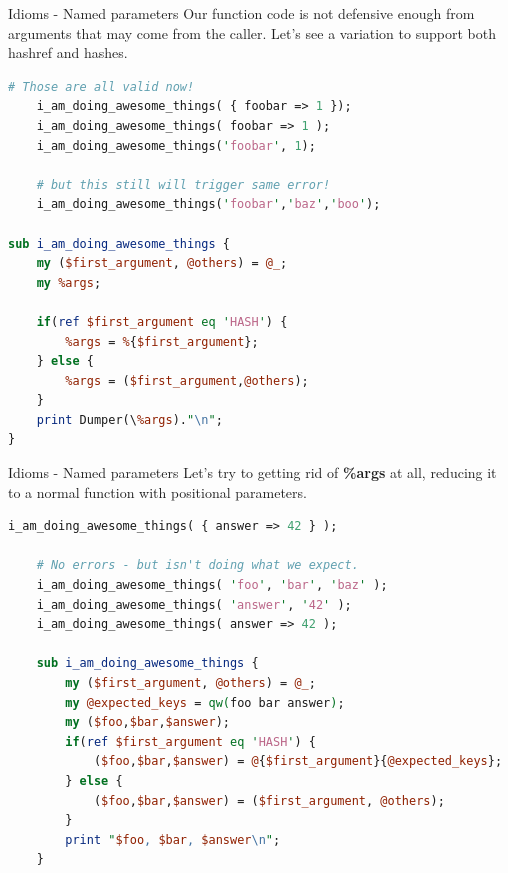 \documentclass[10pt]{beamer}
\begin{document}
\begin{frame}[fragile]{Idioms - Named parameters}
Our function code is not defensive enough from arguments that may come from the caller.
Let's see a variation to support both hashref and hashes.
\begin{lstlisting}[language=perl]
    # Those are all valid now!
    i_am_doing_awesome_things( { foobar => 1 });
    i_am_doing_awesome_things( foobar => 1 );
    i_am_doing_awesome_things('foobar', 1);

    # but this still will trigger same error!
    i_am_doing_awesome_things('foobar','baz','boo');

sub i_am_doing_awesome_things {
    my ($first_argument, @others) = @_;
    my %args;

    if(ref $first_argument eq 'HASH') {
        %args = %{$first_argument};
    } else {
        %args = ($first_argument,@others);
    }
    print Dumper(\%args)."\n";
}
\end{lstlisting}
\end{frame}


\begin{frame}[fragile]{Idioms - Named parameters}
Let's try to getting rid of \textbf{\%args} at all, reducing it to a normal function with positional parameters.
\begin{lstlisting}[language=perl]
    i_am_doing_awesome_things( { answer => 42 } );

    # No errors - but isn't doing what we expect.
    i_am_doing_awesome_things( 'foo', 'bar', 'baz' );
    i_am_doing_awesome_things( 'answer', '42' );
    i_am_doing_awesome_things( answer => 42 );

    sub i_am_doing_awesome_things {
        my ($first_argument, @others) = @_;
        my @expected_keys = qw(foo bar answer);
        my ($foo,$bar,$answer);
        if(ref $first_argument eq 'HASH') {
            ($foo,$bar,$answer) = @{$first_argument}{@expected_keys};
        } else {
            ($foo,$bar,$answer) = ($first_argument, @others);
        }
        print "$foo, $bar, $answer\n";
    }
\end{lstlisting}
\end{frame}
\end{document}
